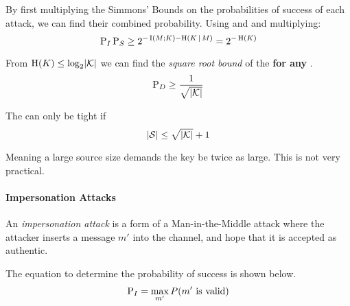 \begin{theorem}\label{thm:Prob_Deception_Square_Root_Bound}
  By first multiplying the Simmons' Bounds on the probabilities of success of each attack, we can find their combined probability.
  Using  and  and multiplying:
  \begin{equation*}
    \operatorname{\operatorname{P}}_{I}\operatorname{\operatorname{P}}_{S} \geq 2^{-\operatorname{\operatorname{I}}(M; K) - \operatorname{\operatorname{H}}(K \operatorname{\vert} M)} = 2^{-\operatorname{\operatorname{H}}(K)}
  \end{equation*}

  From $\operatorname{\operatorname{H}}(K) \leq \log_{2} \lvert \operatorname{\mathcal{K}} \rvert$ we can find the \emph{square root bound} of the  \textbf{for any }.
  \begin{equation}\label{eq:Prob_Deception_Square_Root_Bound}
    \operatorname{\operatorname{P}}_{D} \geq \frac{1}{\sqrt{\lvert \operatorname{\mathcal{K}} \rvert}}
  \end{equation}
\end{theorem}

\begin{theorem}\label{thm:Prob_Deception_Square_Root_Bound_Tightness}
  The  can only be tight if
  \begin{equation}\label{eq:10}
    \lvert \operatorname{\mathcal{S}} \rvert \leq \sqrt{\lvert \operatorname{\mathcal{K}} \rvert} + 1
  \end{equation}

  Meaning a large source size demands the key be twice as large.
  This is not very practical.
\end{theorem}

\paragraph{Impersonation Attacks}\label{par:Attack_Authentication_Code-Impersonation}
\begin{definition}\label{def:Attack_Authentication_Code-Impersonation}
  An \emph{impersonation attack} is a form of a Man-in-the-Middle attack where the attacker inserts a message $m'$ into the channel, and hope that it is accepted as authentic.

  The equation to determine the probability of success is shown below.
  \begin{equation}\label{eq:Attack_Authentication_Code-Impersonation-Success}
    \operatorname{\operatorname{P}}_{I} = \max_{m'} P(m' \text{ is valid})
  \end{equation}
\end{definition}

